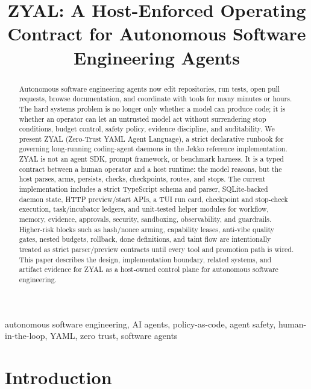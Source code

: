 \documentclass[conference]{IEEEtran}
\newcommand{\ZYAL}{ZYAL}
\begin{document}
\title{\ZYAL: A Host-Enforced Operating Contract for Autonomous Software Engineering Agents}

\author{
}

\maketitle

\begin{abstract}
Autonomous software engineering agents now edit repositories, run tests, open pull requests, browse documentation, and coordinate with tools for many minutes or hours. The hard systems problem is no longer only whether a model can produce code; it is whether an operator can let an untrusted model act without surrendering stop conditions, budget control, safety policy, evidence discipline, and auditability. We present \ZYAL{} (Zero-Trust YAML Agent Language), a strict declarative runbook for governing long-running coding-agent daemons in the Jekko reference implementation. \ZYAL{} is not an agent SDK, prompt framework, or benchmark harness. It is a typed contract between a human operator and a host runtime: the model reasons, but the host parses, arms, persists, checks, checkpoints, routes, and stops. The current implementation includes a strict TypeScript schema and parser, SQLite-backed daemon state, HTTP preview/start APIs, a TUI run card, checkpoint and stop-check execution, task/incubator ledgers, and unit-tested helper modules for workflow, memory, evidence, approvals, security, sandboxing, observability, and guardrails. Higher-risk blocks such as hash/nonce arming, capability leases, anti-vibe quality gates, nested budgets, rollback, done definitions, and taint flow are intentionally treated as strict parser/preview contracts until every tool and promotion path is wired. This paper describes the design, implementation boundary, related systems, and artifact evidence for \ZYAL{} as a host-owned control plane for autonomous software engineering.
\end{abstract}

\begin{IEEEkeywords}
autonomous software engineering, AI agents, policy-as-code, agent safety, human-in-the-loop, YAML, zero trust, software agents
\end{IEEEkeywords}

\section{Introduction}
\end{document}
